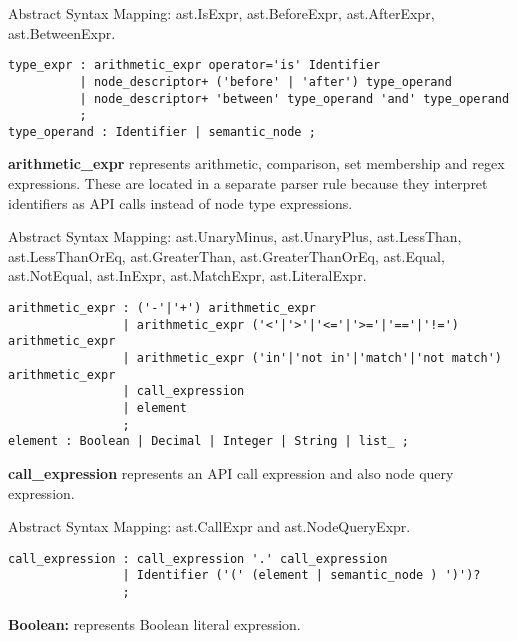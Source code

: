 \begin{description}
Abstract Syntax Mapping: ast.IsExpr, ast.BeforeExpr, ast.AfterExpr, ast.BetweenExpr.

\begin{snippet}
\begin{verbatim}
type_expr : arithmetic_expr operator='is' Identifier
          | node_descriptor+ ('before' | 'after') type_operand
          | node_descriptor+ 'between' type_operand 'and' type_operand
          ;
type_operand : Identifier | semantic_node ;
\end{verbatim}
\end{snippet}

\item\textbf{arithmetic\_expr} represents arithmetic, comparison, set membership and regex expressions. These are located in a separate parser rule because they interpret identifiers as API calls instead of node type expressions.

Abstract Syntax Mapping: ast.UnaryMinus, ast.UnaryPlus, ast.LessThan, ast.LessThanOrEq, ast.GreaterThan, ast.GreaterThanOrEq, ast.Equal, ast.NotEqual, ast.InExpr, ast.MatchExpr, ast.LiteralExpr.

\begin{snippet}
\begin{verbatim}
arithmetic_expr : ('-'|'+') arithmetic_expr
                | arithmetic_expr ('<'|'>'|'<='|'>='|'=='|'!=') arithmetic_expr
                | arithmetic_expr ('in'|'not in'|'match'|'not match') arithmetic_expr
                | call_expression
                | element
                ;
element : Boolean | Decimal | Integer | String | list_ ;
\end{verbatim}
\end{snippet}

\item\textbf{call\_expression} represents an API call expression and also node query expression.

Abstract Syntax Mapping: ast.CallExpr and ast.NodeQueryExpr.

\begin{snippet}
\begin{verbatim}
call_expression : call_expression '.' call_expression
                | Identifier ('(' (element | semantic_node ) ')')? 
                ;
\end{verbatim}
\end{snippet}

\item\textbf{Boolean:} represents Boolean literal expression. 


\end{description}
